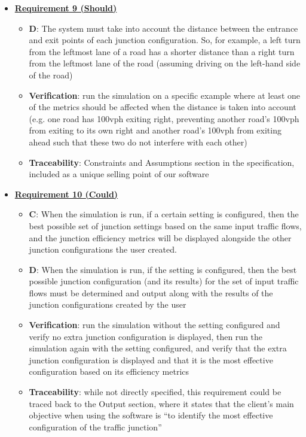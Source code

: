 \documentclass{article}
\begin{document}
\begin{itemize}
    \item \textbf{\underline{Requirement 9 (Should)}}
    \begin{itemize}
        \item \textbf{D}: The system must take into account the distance between the entrance and exit 
            points of each junction configuration. So, for example, a left turn from the 
            leftmost lane of a road has a shorter distance than a right turn from the leftmost 
            lane of the road (assuming driving on the left-hand side of the road)
        \item \textbf{Verification}: run the simulation on a specific example where at least one of 
            the metrics should be affected when the distance is taken into account (e.g. one 
            road has 100vph exiting right, preventing another road’s 100vph from exiting to its
            own right and another road’s 100vph from exiting ahead such that these two do not 
            interfere with each other)
        \item\textbf{Traceability}: Constraints and Assumptions section in the specification, included 
            as a unique selling point of our software
    \end{itemize}

    \item \textbf{\underline{Requirement 10 (Could)}}
    \begin{itemize}
        \item \textbf{C}: When the simulation is run, if a certain setting is configured, then the best 
            possible set of junction settings based on the same input traffic flows, and the 
            junction efficiency metrics will be displayed alongside the other junction 
            configurations the user created.
        \item \textbf{D}: When the simulation is run, if the setting is configured, then the best 
            possible junction configuration (and its results) for the set of input traffic 
            flows must be determined and output along with the results of the junction 
            configurations created by the user
        \item \textbf{Verification}: run the simulation without the setting configured and verify 
            no extra junction configuration is displayed, then run the simulation again with 
            the setting configured, and verify that the extra junction configuration is displayed 
            and that it is the most effective configuration based on its efficiency metrics
        \item\textbf{Traceability}: while not directly specified, this requirement could be traced back 
            to the Output section, where it states that the client’s main objective when using 
            the software is “to identify the most effective configuration of the traffic junction”
    \end{itemize}


\end{itemize}
\end{document}
